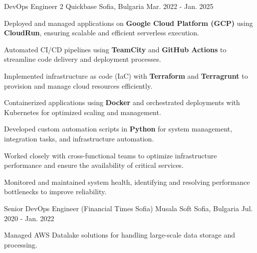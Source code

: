 

\begin{cventries}

  \cventry
    {DevOps Engineer 2} %
    {Quickbase} %
    {Sofia, Bulgaria} %
    {Mar. 2022 - Jan. 2025} %
    {
      \begin{cvitems} %
        \item {Deployed and managed applications on \textbf{Google Cloud Platform (GCP)} using \textbf{CloudRun}, ensuring scalable and efficient serverless execution.}
        \item {Automated CI/CD pipelines using \textbf{TeamCity} and \textbf{GitHub Actions} to streamline code delivery and deployment processes.}
        \item {Implemented infrastructure as code (IaC) with \textbf{Terraform} and \textbf{Terragrunt} to provision and manage cloud resources efficiently.}
        \item {Containerized applications using \textbf{Docker} and orchestrated deployments with Kubernetes for optimized scaling and management.}
        \item {Developed custom automation scripts in \textbf{Python} for system management, integration tasks, and infrastructure automation.}
        \item {Worked closely with cross-functional teams to optimize infrastructure performance and ensure the availability of critical services.}
        \item {Monitored and maintained system health, identifying and resolving performance bottlenecks to improve reliability.}
      \end{cvitems}
    }
  \cventry
    {Senior DevOps Engineer (Financial Times Sofia)} %
    {Musala Soft} %
    {Sofia, Bulgaria} %
    {Jul. 2020 - Jan. 2022} %
    {
      \begin{cvitems} %
        \item {Managed AWS Datalake solutions for handling large-scale data storage and processing.}

\end{cvitems}}
\end{cventries}
